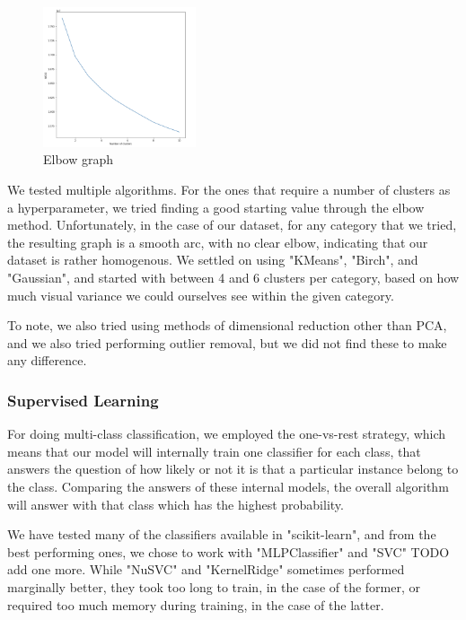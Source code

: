 \documentclass[a4paper, twocolumn]{article}
\begin{document}
    \begin{figure}[H]
        \centering
        \includegraphics[width=0.4\textwidth]{figures/elbow.png}
        \caption{Elbow graph}
        \label{fig:elbow}
    \end{figure}

We tested multiple algorithms. For the ones that require a number of clusters as a hyperparameter, we tried finding a good starting value through the elbow method. Unfortunately, in the case of our dataset, for any category that we tried, the resulting graph is a smooth arc, with no clear elbow, indicating that our dataset is rather homogenous. We settled on using "KMeans", "Birch", and "Gaussian", and started with between 4 and 6 clusters per category, based on how much visual variance we could ourselves see within the given category.

To note, we also tried using methods of dimensional reduction other than PCA, and we also tried performing outlier removal, but we did not find these to make any difference.

\subsubsection{Supervised Learning\label{sec:Supervised Learning}}
For doing multi-class classification, we employed the one-vs-rest strategy, which means that our model will internally train one classifier for each class, that answers the question of how likely or not it is that a particular instance belong to the class. Comparing the answers of these internal models, the overall algorithm will answer with that class which has the highest probability.

We have tested many of the classifiers available in "scikit-learn", and from the best performing ones, we chose to work with "MLPClassifier" and "SVC" TODO add one more. While "NuSVC" and "KernelRidge" sometimes performed marginally better, they took too long to train, in the case of the former, or required too much memory during training, in the case of the latter.
\end{document}
